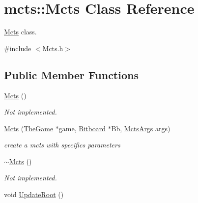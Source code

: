 \hypertarget{classmcts_1_1_mcts}{\section{mcts\+:\+:Mcts Class Reference}
\label{classmcts_1_1_mcts}
}


\hyperlink{classmcts_1_1_mcts}{Mcts} class.  




{\ttfamily \#include $<$Mcts.\+h$>$}

\subsection*{Public Member Functions}
\begin{DoxyCompactItemize}
\item 
\hypertarget{classmcts_1_1_mcts_ad02b46adb483edd120569db71cb4d3f7}{\hyperlink{classmcts_1_1_mcts_ad02b46adb483edd120569db71cb4d3f7}{Mcts} ()}\label{classmcts_1_1_mcts_ad02b46adb483edd120569db71cb4d3f7}

\begin{DoxyCompactList}\small\item\em Not implemented. \end{DoxyCompactList}\item 
\hyperlink{classmcts_1_1_mcts_a13ddc3e70f7e9a04c36f79c5f6254e7a}{Mcts} (\hyperlink{class_the_game}{The\+Game} $\ast$game, \hyperlink{class_bitboard}{Bitboard} $\ast$Bb, \hyperlink{classmcts_1_1_mcts_args}{Mcts\+Args} args)
\begin{DoxyCompactList}\small\item\em create a mcts with specifics parameters \end{DoxyCompactList}\item 
\hypertarget{classmcts_1_1_mcts_afb758831416d24b400def54eeda53122}{\hyperlink{classmcts_1_1_mcts_afb758831416d24b400def54eeda53122}{$\sim$\+Mcts} ()}\label{classmcts_1_1_mcts_afb758831416d24b400def54eeda53122}

\begin{DoxyCompactList}\small\item\em Not implemented. \end{DoxyCompactList}\item 
\hypertarget{classmcts_1_1_mcts_aa9ac3cc5372f4fc2617fcb0aa44b278e}{void \hyperlink{classmcts_1_1_mcts_aa9ac3cc5372f4fc2617fcb0aa44b278e}{Update\+Root} ()}\label{classmcts_1_1_mcts_aa9ac3cc5372f4fc2617fcb0aa44b278e}


\end{DoxyCompactItemize}
